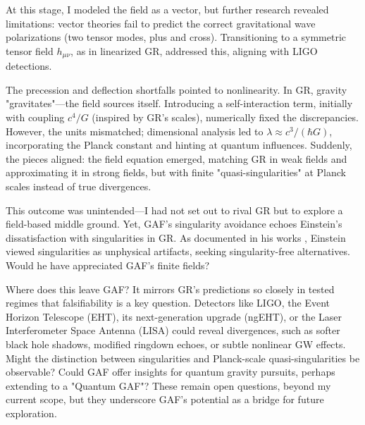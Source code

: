 At this stage, I modeled the field as a vector, but further research revealed limitations: vector theories fail to predict the correct gravitational wave polarizations (two tensor modes, plus and cross). Transitioning to a symmetric tensor field \( h_{\mu\nu} \), as in linearized GR, addressed this, aligning with LIGO detections.

The precession and deflection shortfalls pointed to nonlinearity. In GR, gravity "gravitates"—the field sources itself. Introducing a self-interaction term, initially with coupling \( c^4 / G \) (inspired by GR's scales), numerically fixed the discrepancies. However, the units mismatched; dimensional analysis led to \( \lambda \approx c^3 / (\hbar G) \), incorporating the Planck constant and hinting at quantum influences. Suddenly, the pieces aligned: the field equation emerged, matching GR in weak fields and approximating it in strong fields, but with finite "quasi-singularities" at Planck scales instead of true divergences.

This outcome was unintended—I had not set out to rival GR but to explore a field-based middle ground. Yet, GAF's singularity avoidance echoes Einstein's dissatisfaction with singularities in GR. As documented in his works \cite{EinsteinRosen1935}\cite{Einstein1939}\cite{EinsteinDeSitter1917}, Einstein viewed singularities as unphysical artifacts, seeking singularity-free alternatives. Would he have appreciated GAF's finite fields?

Where does this leave GAF? It mirrors GR's predictions so closely in tested regimes that falsifiability is a key question. Detectors like LIGO, the Event Horizon Telescope (EHT), its next-generation upgrade (ngEHT), or the Laser Interferometer Space Antenna (LISA) could reveal divergences, such as softer black hole shadows, modified ringdown echoes, or subtle nonlinear GW effects. Might the distinction between singularities and Planck-scale quasi-singularities be observable? Could GAF offer insights for quantum gravity pursuits, perhaps extending to a "Quantum GAF"? These remain open questions, beyond my current scope, but they underscore GAF's potential as a bridge for future exploration.